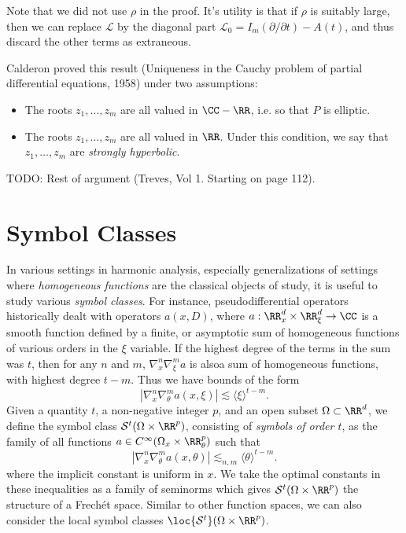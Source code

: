 \begin{remark}
    Note that we did not use $\rho$ in the proof. It's utility is that if $\rho$ is suitably large, then we can replace $\mathcal{L}$ by the diagonal part $\mathcal{L}_0 = I_m (\partial / \partial t) - A(t)$, and thus discard the other terms as extraneous.
\end{remark}

Calderon proved this result (Uniqueness in the Cauchy problem of partial differential equations, 1958) under two assumptions:
%
\begin{itemize}
    \item The roots $z_1,\dots,z_m$ are all valued in $\CC - \RR$, i.e. so that $P$ is elliptic.

    \item The roots $z_1,\dots,z_m$ are all valued in $\RR$. Under this condition, we say that $z_1,\dots,z_m$ are \emph{strongly hyperbolic}.
\end{itemize} 
%
TODO: Rest of argument (Treves, Vol 1. Starting on page 112).














\chapter{Symbol Classes}

In various settings in harmonic analysis, especially generalizations of settings where \emph{homogeneous functions} are the classical objects of study, it is useful to study various \emph{symbol classes}. For instance, pseudodifferential operators historically dealt with operators $a(x,D)$, where $a: \RR^d_x \times \RR^d_\xi \to \CC$ is a smooth function defined by a finite, or asymptotic sum of homogeneous functions of various orders in the $\xi$ variable. If the highest degree of the terms in the sum was $t$, then for any $n$ and $m$, $\nabla^n_x \nabla^m_\xi a$ is alsoa sum of homogeneous functions, with highest degree $t - m$. Thus we have bounds of the form
%
\[ | \nabla^n_x \nabla^m_\theta a(x,\xi) | \lesssim \langle \xi \rangle^{t - m}. \]
%
Given a quantity $t$, a non-negative integer $p$, and an open subset $\Omega \subset \RR^d$, we define the symbol class $\mathcal{S}^t(\Omega \times \RR^p)$, consisting of \emph{symbols of order $t$}, as the family of all functions $a \in C^\infty(\Omega_x \times \RR^p_\theta)$ such that
%
\[ |\nabla^n_x \nabla^m_\theta a(x,\theta)| \lesssim_{n,m} \langle \theta \rangle^{t-m}. \]
%
where the implicit constant is uniform in $x$. We take the optimal constants in these inequalities as a family of seminorms which gives $\mathcal{S}^t(\Omega \times \RR^p)$ the structure of a Frech\'{e}t space. Similar to other function spaces, we can also consider the local symbol classes $\loc{\mathcal{S}^t}(\Omega \times \RR^p)$.

